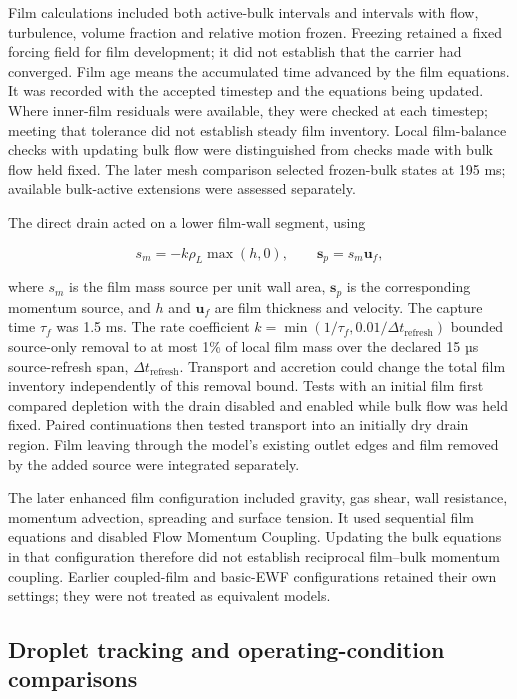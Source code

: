 Film calculations included both active-bulk intervals and intervals with flow, turbulence, volume fraction and relative motion frozen. Freezing retained a fixed forcing field for film development; it did not establish that the carrier had converged. Film age means the accumulated time advanced by the film equations. It was recorded with the accepted timestep and the equations being updated. Where inner-film residuals were available, they were checked at each timestep; meeting that tolerance did not establish steady film inventory. Local film-balance checks with updating bulk flow were distinguished from checks made with bulk flow held fixed. The later mesh comparison selected frozen-bulk states at 195 ms; available bulk-active extensions were assessed separately.

The direct drain acted on a lower film-wall segment, using

\[s_m=-k\rho_L\max(h,0),\qquad \boldsymbol{s}_p=s_m\boldsymbol{u}_f,\]

where \(s_m\) is the film mass source per unit wall area, \(\boldsymbol{s}_p\) is the corresponding momentum source, and \(h\) and \(\boldsymbol{u}_f\) are film thickness and velocity. The capture time \(\tau_f\) was 1.5 ms. The rate coefficient \(k=\min(1/\tau_f,0.01/\Delta t_{\mathrm{refresh}})\) bounded source-only removal to at most 1\% of local film mass over the declared 15 µs source-refresh span, \(\Delta t_{\mathrm{refresh}}\). Transport and accretion could change the total film inventory independently of this removal bound. Tests with an initial film first compared depletion with the drain disabled and enabled while bulk flow was held fixed. Paired continuations then tested transport into an initially dry drain region. Film leaving through the model's existing outlet edges and film removed by the added source were integrated separately.

The later enhanced film configuration included gravity, gas shear, wall resistance, momentum advection, spreading and surface tension. It used sequential film equations and disabled Flow Momentum Coupling. Updating the bulk equations in that configuration therefore did not establish reciprocal film--bulk momentum coupling. Earlier coupled-film and basic-EWF configurations retained their own settings; they were not treated as equivalent models.

\subsection{Droplet tracking and operating-condition comparisons}

